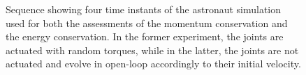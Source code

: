 \begin{figure}
    \centering
    \caption{Sequence showing four time instants of the astronaut simulation used for both the assessments of the momentum conservation and the energy conservation. In the former experiment, the joints are actuated with random torques, while in the latter, the joints are not actuated and evolve in open-loop accordingly to their initial velocity.}
    \label{fig:astronaut_experiment}
\end{figure}

